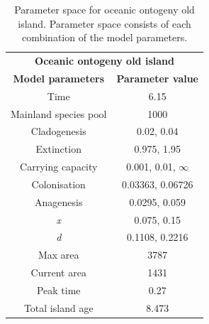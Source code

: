 \begin{table}[ht]
    \centering
    \caption{Parameter space for oceanic ontogeny old island. Parameter space consists of each combination of the model parameters.}
    \begin{tabular}{ c | c }
        \multicolumn{2}{c}{\textbf{Oceanic ontogeny old island}} \\
        \textbf{Model parameters} & \textbf{Parameter value} \\ 
        \hline
        \hline
        Time & 6.15 \\
        \hline
        Mainland species pool & 1000 \\
        \hline
        Cladogenesis & 0.02, 0.04 \\
        \hline
        Extinction & 0.975, 1.95 \\
        \hline
        Carrying capacity & 0.001, 0.01, $\infty$ \\
        \hline
        Colonisation & 0.03363, 0.06726 \\
        \hline
        Anagenesis & 0.0295, 0.059 \\
        \hline
        \textit{x} & 0.075, 0.15 \\
        \hline
        \textit{d} & 0.1108, 0.2216 \\
        \hline
        Max area & 3787 \\
        \hline
        Current area & 1431 \\
        \hline
        Peak time & 0.27 \\
        \hline
        Total island age & 8.473 \\
    \end{tabular}
    \label{tab:oceanic_ontogeny_old}
\end{table}

